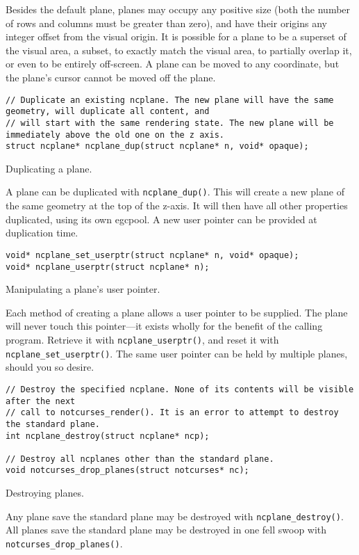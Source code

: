 Besides the default plane, planes may occupy any positive size (both the number
of rows and columns must be greater than zero), and have their origins any
integer offset from the visual origin. It is possible for a plane to be a
superset of the visual area, a subset, to exactly match the visual area, to
partially overlap it, or even to be entirely off-screen. A plane can be
moved to any coordinate, but the plane's cursor cannot be moved off the plane.
\begin{listing}[!htb]
\begin{verbatim}
// Duplicate an existing ncplane. The new plane will have the same geometry, will duplicate all content, and
// will start with the same rendering state. The new plane will be immediately above the old one on the z axis.
struct ncplane* ncplane_dup(struct ncplane* n, void* opaque);
\end{verbatim}
\caption{Duplicating a plane.}
\end{listing}
A plane can be duplicated with \texttt{ncplane\_dup()}. This will create a new
plane of the same geometry at the top of the z-axis. It will then have all
other properties duplicated, using its own egcpool. A new user pointer can be
provided at duplication time.
\begin{listing}[!htb]
\begin{verbatim}
void* ncplane_set_userptr(struct ncplane* n, void* opaque);
void* ncplane_userptr(struct ncplane* n);
\end{verbatim}
\caption{Manipulating a plane's user pointer.}
\end{listing}
Each method of creating a plane allows a user pointer to be supplied. The plane
will never touch this pointer---it exists wholly for the benefit of the calling
program. Retrieve it with \texttt{ncplane\_userptr()}, and reset it with
\texttt{ncplane\_set\_userptr()}. The same user pointer can be held by multiple
planes, should you so desire.

\begin{listing}[!htb]
\begin{verbatim}
// Destroy the specified ncplane. None of its contents will be visible after the next
// call to notcurses_render(). It is an error to attempt to destroy the standard plane.
int ncplane_destroy(struct ncplane* ncp);

// Destroy all ncplanes other than the standard plane.
void notcurses_drop_planes(struct notcurses* nc);
\end{verbatim}
\caption{Destroying planes.}
\end{listing}
Any plane save the standard plane may be destroyed with \texttt{ncplane\_destroy()}.
All planes save the standard plane may be destroyed in one fell swoop with
\texttt{notcurses\_drop\_planes()}.

